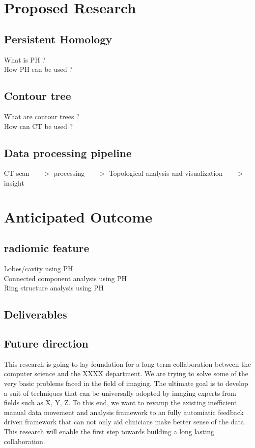 \documentclass[11pt]{article}
\begin{document}
\section{Proposed Research}

\subsection{Persistent Homology}
What is PH ?\\
How PH can be used ?\\

\subsection{Contour tree}
What are contour trees ?\\
How can CT be used ?\\

\subsection{Data processing pipeline}
CT scan $-->$ processing $-->$ Topological analysis and visualization $-->$ insight\\


\clearpage
\section{Anticipated Outcome}
\subsection{radiomic feature}
Lobes/cavity using PH\\
Connected component analysis using PH\\
Ring structure analysis using PH\\


\clearpage
\subsection{Deliverables}


\subsection{Future direction}
This research is going to lay foundation for a long term collaboration between the computer science and the XXXX department. We are trying to solve some of the very basic problems faced in the field of imaging. The ultimate goal is to develop a suit of techniques that can be universally adopted by imaging experts from fields such as  X, Y, Z. To this end, we want to revamp the existing inefficient manual data movement and analysis framework to an fully automiatic feedback driven framework that can not only aid clinicians make better sense of the data. This research will enable the first step towards building a long lasting collaboration.
\end{document}

